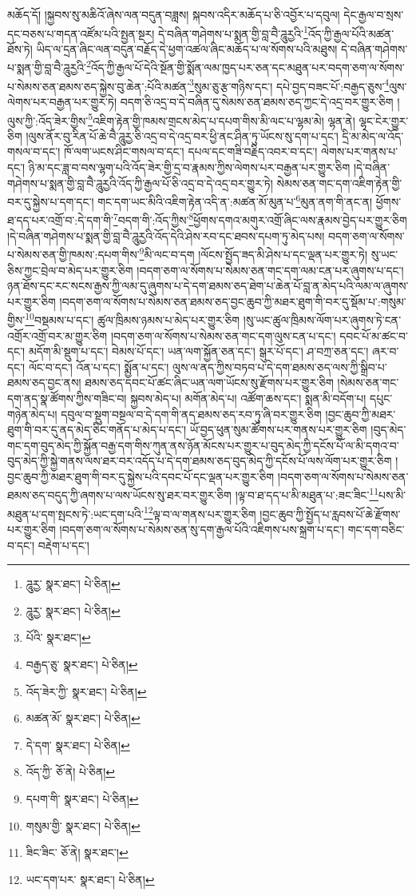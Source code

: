 མཆོད་དོ། །སྐྱབས་སུ་མཆིའོ་ཞེས་ལན་བདུན་བཟླས། སྐབས་འདིར་མཆོད་པ་ཅི་འབྱོར་པ་དབུལ། དེང་རྒྱལ་བ་སྲས་དང་བཅས་པ་གདན་འཛོམ་པའི་སྤྱན་སྔར། དེ་བཞིན་གཤེགས་པ་སྨན་གྱི་བླ་བཻ་ཌཱུརྱའི་\footnote{ཌཱུརྱ་  སྣར་ཐང་།  པེ་ཅིན། }འོད་ཀྱི་རྒྱལ་པོའི་མཚན་ཐོས་ཏེ། ཡིད་ལ་དྲན་ཞིང་ལན་བདུན་བརྗོད་དེ་ཕྱག་འཚལ་ཞིང་མཆོད་པ་ལ་སོགས་པའི་མཐུས། དེ་བཞིན་གཤེགས་པ་སྨན་གྱི་བླ་བཻ་ཌཱུརྱའི་\footnote{ཌཱུརྱ་  སྣར་ཐང་།  པེ་ཅིན། }འོད་ཀྱི་རྒྱལ་པོ་དེའི་སྔོན་གྱི་སྨོན་ལམ་ཁྱད་པར་ཅན་དང་མཐུན་པར་བདག་ཅག་ལ་སོགས་པ་སེམས་ཅན་ཐམས་ཅད་སྐྱེས་བུ་ཆེན་:པོའི་མཚན་\footnote{པོའི་  སྣར་ཐང་། }སུམ་ཅུ་རྩ་གཉིས་དང་། དཔེ་བྱད་བཟང་པོ་:བརྒྱད་ཅུས་\footnote{བརྒྱད་ཅུ་  སྣར་ཐང་།  པེ་ཅིན། }ལུས་ལེགས་པར་བརྒྱན་པར་གྱུར་ཏེ། བདག་ཅི་འདྲ་བ་དེ་བཞིན་དུ་སེམས་ཅན་ཐམས་ཅད་ཀྱང་དེ་འདྲ་བར་གྱུར་ཅིག །ལུས་ཀྱི་:འོད་ཟེར་གྱིས་\footnote{འོད་ཟེར་ཀྱི་  སྣར་ཐང་།  པེ་ཅིན། }འཇིག་རྟེན་གྱི་ཁམས་གྲངས་མེད་པ་དཔག་གིས་མི་ལང་པ་ལྷམ་མེ། ལྷན་ནེ། ལྷང་ངེར་གྱུར་ཅིག །ལུས་ནོར་བུ་རིན་པོ་ཆེ་བཻ་ཌཱུརྱ་ཅི་འདྲ་བ་དེ་འདྲ་བར་ཕྱི་ནང་ཤིན་ཏུ་ཡོངས་སུ་དག་པ་དང་། དྲི་མ་མེད་ལ་འོད་གསལ་བ་དང་། ཁོ་ལག་ཡངས་ཤིང་གསལ་བ་དང་། དཔལ་དང་གཟི་བརྗིད་འབར་བ་དང་། ལེགས་པར་གནས་པ་དང་། ཉི་མ་དང་ཟླ་བ་བས་ལྷག་པའི་འོད་ཟེར་གྱི་དྲ་བ་རྣམས་ཀྱིས་ལེགས་པར་བརྒྱན་པར་གྱུར་ཅིག །དེ་བཞིན་གཤེགས་པ་སྨན་གྱི་བླ་བཻ་ཌཱུརྱའི་འོད་ཀྱི་རྒྱལ་པོ་ཅི་འདྲ་བ་དེ་འདྲ་བར་གྱུར་ཏེ། སེམས་ཅན་གང་དག་འཇིག་རྟེན་གྱི་བར་དུ་སྐྱེས་པ་དག་དང་། གང་དག་ཡང་མིའི་འཇིག་རྟེན་འདི་ན་:མཚན་མོ་མུན་པ་\footnote{མཚན་མོ་  སྣར་ཐང་།  པེ་ཅིན། }མུན་ནག་གི་ནང་ན། ཕྱོགས་ཐ་དད་པར་འགྲོ་བ་:དེ་དག་གི་\footnote{དེ་དག་  སྣར་ཐང་།  པེ་ཅིན། }བདག་གི་:འོད་ཀྱིས་\footnote{འོད་ཀྱི་  ཅོ་ནེ།  པེ་ཅིན། }ཕྱོགས་དགའ་མགུར་འགྲོ་ཞིང་ལས་རྣམས་བྱེད་པར་གྱུར་ཅིག །དེ་བཞིན་གཤེགས་པ་སྨན་གྱི་བླ་བཻ་ཌཱུརྱའི་འོད་དེའི་ཤེས་རབ་དང་ཐབས་དཔག་ཏུ་མེད་པས། བདག་ཅག་ལ་སོགས་པ་སེམས་ཅན་གྱི་ཁམས་:དཔག་གིས་\footnote{དཔག་གི་  སྣར་ཐང་།  པེ་ཅིན། }མི་ལང་བ་དག །ལོངས་སྤྱོད་ཟད་མི་ཤེས་པ་དང་ལྡན་པར་གྱུར་ཏེ། སུ་ཡང་ཅིས་ཀྱང་བྲེལ་བ་མེད་པར་གྱུར་ཅིག །བདག་ཅག་ལ་སོགས་པ་སེམས་ཅན་གང་དག་ལམ་ངན་པར་ཞུགས་པ་དང་། ཉན་ཐོས་དང་རང་སངས་རྒྱས་ཀྱི་ལམ་དུ་ཞུགས་པ་དེ་དག་ཐམས་ཅད་ཐེག་པ་ཆེན་པོ་བླ་ན་མེད་པའི་ལམ་ལ་ཞུགས་པར་གྱུར་ཅིག །བདག་ཅག་ལ་སོགས་པ་སེམས་ཅན་ཐམས་ཅད་བྱང་ཆུབ་ཀྱི་མཐར་ཐུག་གི་བར་དུ་སྡོམ་པ་:གསུམ་གྱིས་\footnote{གསུམ་གྱི་  སྣར་ཐང་།  པེ་ཅིན། }བསྡམས་པ་དང་། ཚུལ་ཁྲིམས་ཉམས་པ་མེད་པར་གྱུར་ཅིག །སུ་ཡང་ཚུལ་ཁྲིམས་ལོག་པར་ཞུགས་ཏེ་ངན་འགྲོར་འགྲོ་བར་མ་གྱུར་ཅིག །བདག་ཅག་ལ་སོགས་པ་སེམས་ཅན་གང་དག་ལུས་ངན་པ་དང་། དབང་པོ་མ་ཚང་བ་དང་། མདོག་མི་སྡུག་པ་དང་། བེམས་པོ་དང་། ཡན་ལག་སྐྱོན་ཅན་དང་། སྒུར་པོ་དང་། ཤ་བཀྲ་ཅན་དང་། ཞར་བ་དང་། ལོང་བ་དང་། འོན་པ་དང་། སྨྱོན་པ་དང་། ལུས་ལ་ནད་ཀྱིས་བཏབ་པ་དེ་དག་ཐམས་ཅད་ལས་ཀྱི་སྒྲིབ་པ་ཐམས་ཅད་བྱང་ནས། ཐམས་ཅད་དབང་པོ་ཚང་ཞིང་ཡན་ལག་ཡོངས་སུ་རྫོགས་པར་གྱུར་ཅིག །སེམས་ཅན་གང་དག་ནད་སྣ་ཚོགས་ཀྱིས་གཟིང་བ། སྐྱབས་མེད་པ། མགོན་མེད་པ། འཚོག་ཆས་དང་། སྨན་མི་བདོག་པ། དཔུང་གཉེན་མེད་པ། དབུལ་བ་སྡུག་བསྔལ་བ་དེ་དག་གི་ནད་ཐམས་ཅད་རབ་ཏུ་ཞི་བར་གྱུར་ཅིག །བྱང་ཆུབ་ཀྱི་མཐར་ཐུག་གི་བར་དུ་ནད་མེད་ཅིང་གནོད་པ་མེད་པ་དང་། ཡོ་བྱད་ཕུན་སུམ་ཚོགས་པར་གནས་པར་གྱུར་ཅིག །བུད་མེད་གང་དག་བུད་མེད་ཀྱི་སྐྱོན་བརྒྱ་དག་གིས་ཀུན་ནས་ཉོན་མོངས་པར་གྱུར་པ་བུད་མེད་ཀྱི་དངོས་པོ་ལ་མི་དགའ་བ་བུད་མེད་ཀྱི་སྐྱེ་གནས་ལས་ཐར་བར་འདོད་པ་དེ་དག་ཐམས་ཅད་བུད་མེད་ཀྱི་དངོས་པོ་ལས་ལོག་པར་གྱུར་ཅིག །བྱང་ཆུབ་ཀྱི་མཐར་ཐུག་གི་བར་དུ་སྐྱེས་པའི་དབང་པོ་དང་ལྡན་པར་གྱུར་ཅིག །བདག་ཅག་ལ་སོགས་པ་སེམས་ཅན་ཐམས་ཅད་བདུད་ཀྱི་ཞགས་པ་ལས་ཡོངས་སུ་ཐར་བར་གྱུར་ཅིག །ལྟ་བ་ཐ་དད་པ་མི་མཐུན་པ་:ཟང་ཟིང་\footnote{ཟིང་ཟིང་  ཅོ་ནེ།  སྣར་ཐང་། }པས་མི་མཐུན་པ་དག་སྤངས་ཏེ་:ཡང་དག་པའི་\footnote{ཡང་དག་པར་  སྣར་ཐང་།  པེ་ཅིན། }ལྟ་བ་ལ་གནས་པར་གྱུར་ཅིག །བྱང་ཆུབ་ཀྱི་སྤྱོད་པ་རླབས་པོ་ཆེ་རྫོགས་པར་གྱུར་ཅིག །བདག་ཅག་ལ་སོགས་པ་སེམས་ཅན་སུ་དག་རྒྱལ་པོའི་འཇིགས་པས་སྐྲག་པ་དང་། གང་དག་བཅིང་བ་དང་། བརྡེག་པ་དང་། 